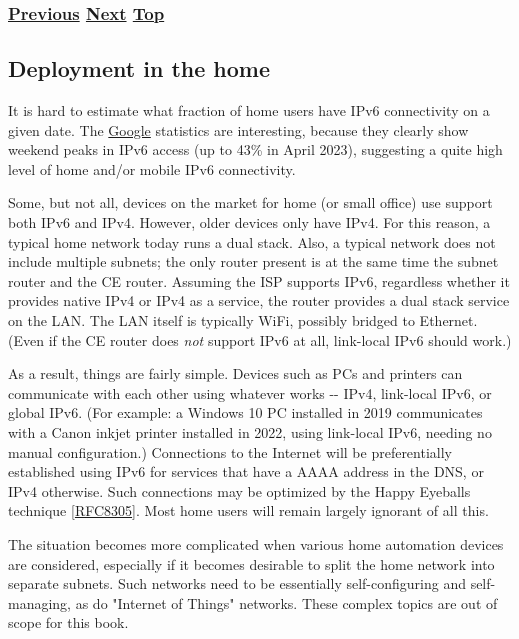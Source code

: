 \documentclass[
]{article}
\begin{document}
\subsubsection{\texorpdfstring{\hyperref[status]{Previous}
\hyperref[deployment-in-the-home]{Next}
\hyperref[deployment-status]{Top}}{Previous Next Top}}\label{previous-next-top-35}

\pagebreak

\subsection{Deployment in the home}\label{deployment-in-the-home}

It is hard to estimate what fraction of home users have IPv6
connectivity on a given date. The
\href{https://www.google.com/intl/en/ipv6/statistics.html}{Google}
statistics are interesting, because they clearly show weekend peaks in
IPv6 access (up to 43\% in April 2023), suggesting a quite high level of
home and/or mobile IPv6 connectivity.

Some, but not all, devices on the market for home (or small office) use
support both IPv6 and IPv4. However, older devices only have IPv4. For
this reason, a typical home network today runs a dual stack. Also, a
typical network does not include multiple subnets; the only router
present is at the same time the subnet router and the CE router.
Assuming the ISP supports IPv6, regardless whether it provides native
IPv4 or IPv4 as a service, the router provides a dual stack service on
the LAN. The LAN itself is typically WiFi, possibly bridged to Ethernet.
(Even if the CE router does \emph{not} support IPv6 at all, link-local
IPv6 should work.)

As a result, things are fairly simple. Devices such as PCs and printers
can communicate with each other using whatever works -\/- IPv4,
link-local IPv6, or global IPv6. (For example: a Windows 10 PC installed
in 2019 communicates with a Canon inkjet printer installed in 2022,
using link-local IPv6, needing no manual configuration.) Connections to
the Internet will be preferentially established using IPv6 for services
that have a AAAA address in the DNS, or IPv4 otherwise. Such connections
may be optimized by the Happy Eyeballs technique
{[}\href{https://www.rfc-editor.org/info/rfc8305}{RFC8305}{]}. Most home
users will remain largely ignorant of all this.

The situation becomes more complicated when various home automation
devices are considered, especially if it becomes desirable to split the
home network into separate subnets. Such networks need to be essentially
self-configuring and self-managing, as do "Internet of Things" networks.
These complex topics are out of scope for this book.
\end{document}
